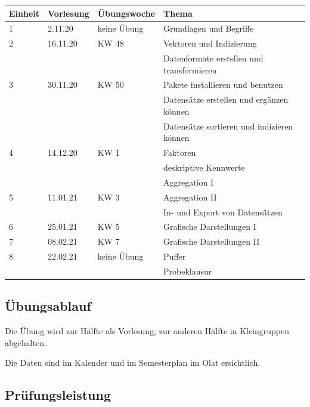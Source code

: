 \documentclass[
]{book}
\begin{document}
\begin{table}[H]
\centering\begingroup\fontsize{15}{17}\selectfont

\begin{tabular}{l|l|l|l}
\hline
Einheit & Vorlesung & Übungswoche & Thema\\
\hline
1 & 2.11.20 & keine Übung & Grundlagen und Begriffe\\
\hline
2 & 16.11.20 & KW 48 & Vektoren und Indizierung\\
\hline
 &  &  & Datenformate erstellen und transformieren\\
\hline
3 & 30.11.20 & KW 50 & Pakete installieren und benutzen\\
\hline
 &  &  & Datensätze erstellen und ergänzen können\\
\hline
 &  &  & Datensätze sortieren und indizieren können\\
\hline
4 & 14.12.20 & KW 1 & Faktoren\\
\hline
 &  &  & deskriptive Kennwerte\\
\hline
 &  &  & Aggregation I\\
\hline
5 & 11.01.21 & KW 3 & Aggregation II\\
\hline
 &  &  & In- und Export von Datensätzen\\
\hline
6 & 25.01.21 & KW 5 & Grafische Darstellungen I\\
\hline
7 & 08.02.21 & KW 7 & Grafische Darstellungen II\\
\hline
8 & 22.02.21 & keine Übung & Puffer\\
\hline
 &  &  & Probeklausur\\
\hline
\end{tabular}
\endgroup{}
\end{table}

\hypertarget{uxfcbungsablauf}{%
\subsection*{Übungsablauf}\label{uxfcbungsablauf}}

Die Übung wird zur Hälfte als Vorlesung, zur anderen Hälfte in Kleingruppen abgehalten.

Die Daten sind im Kalender und im Semesterplan im Olat ersichtlich.

\hypertarget{pruxfcfungsleistung-1}{%
\subsection*{Prüfungsleistung}\label{pruxfcfungsleistung-1}}
\end{document}
